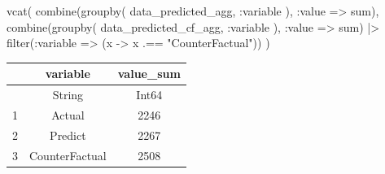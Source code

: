 \documentclass[
  letterpaper,
  DIV=11,
  numbers=noendperiod]{scrreprt}
\newenvironment{Shaded}{\begin{snugshade}}{\end{snugshade}}
\newcommand{\FunctionTok}[1]{\textcolor[rgb]{0.28,0.35,0.67}{#1}}
\newcommand{\NormalTok}[1]{\textcolor[rgb]{0.00,0.23,0.31}{#1}}
\newcommand{\OperatorTok}[1]{\textcolor[rgb]{0.37,0.37,0.37}{#1}}
\newcommand{\StringTok}[1]{\textcolor[rgb]{0.13,0.47,0.30}{#1}}
\begin{document}
\begin{Shaded}
\begin{Highlighting}[]
\FunctionTok{vcat}\NormalTok{(}
    \FunctionTok{combine}\NormalTok{(}\FunctionTok{groupby}\NormalTok{(}
\NormalTok{        data\_predicted\_agg, }\OperatorTok{:}\NormalTok{variable}
\NormalTok{        ), }\OperatorTok{:}\NormalTok{value }\OperatorTok{=\textgreater{}}\NormalTok{ sum),}
    \FunctionTok{combine}\NormalTok{(}\FunctionTok{groupby}\NormalTok{(}
\NormalTok{        data\_predicted\_cf\_agg, }\OperatorTok{:}\NormalTok{variable}
\NormalTok{        ), }\OperatorTok{:}\NormalTok{value }\OperatorTok{=\textgreater{}}\NormalTok{ sum) }\OperatorTok{|\textgreater{}} 
        \FunctionTok{filter}\NormalTok{(}\OperatorTok{:}\NormalTok{variable }\OperatorTok{=\textgreater{}}\NormalTok{ (x }\OperatorTok{{-}\textgreater{}}\NormalTok{ x }\OperatorTok{.==} \StringTok{"CounterFactual"}\NormalTok{))}
\NormalTok{)}
\end{Highlighting}
\end{Shaded}

\begin{tabular}{r|cc}
    & variable & value\_sum\\
    \hline
    & String & Int64\\
    \hline
    1 & Actual & 2246 \\
    2 & Predict & 2267 \\
    3 & CounterFactual & 2508 \\
\end{tabular}
\end{document}
